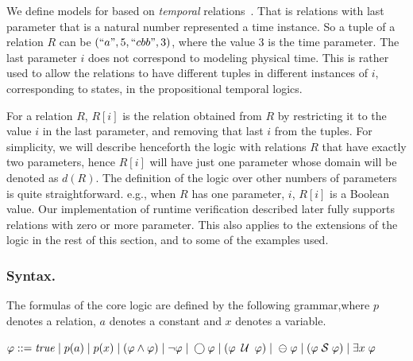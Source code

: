 We define models for \FLTL{} based on {\em temporal} relations~\cite{Chomicki}. That is relations with
last parameter
that is a natural number represented a time instance. So a tuple of
a relation $R$ can be $(``a", 5, ``cbb", 3)$, where
the  value $3$ is the time parameter. The last parameter $i$
does not correspond to modeling physical time. This
is rather used to allow the relations to have
different tuples in different instances of $i$,
corresponding to states, in the propositional temporal
logics.

For a relation $R$, $R [ i ]$ is the relation obtained from $R$ by
restricting it to the value $i$ in the last parameter, and removing that last $i$ from the tuples. For simplicity, we will describe henceforth
the logic with relations $R$ that have exactly two parameters, 
hence $R [ i ]$ will have just one parameter whose domain will be denoted as $d ( R )$. The definition of the logic over other numbers of parameters is quite straightforward. e.g., when $R$ has one parameter, $i$,
$R [ i ]$ is a Boolean value. Our implementation of runtime verification described later fully supports relations with zero or more parameter. This also applies to the extensions of the logic in the rest of this section, and to some of the examples used.



\subsubsection{Syntax.} 

The formulas of the core \FLTL{} logic are 
defined by the following grammar,where $p$ denotes a relation,
$a$ denotes a constant and $x$ denotes a variable. 
\begin{center}
$\varphi ::= \mathit{true}  \; | \;
    p ( a ) \; | \;
    p ( x ) \; | \;
    ( \varphi \wedge \varphi ) \;  |   \;
   \neg \varphi \; | \;
   \bigcirc \varphi \; | \; 
   ( \varphi \; \mathbin{\mathcal{U}} \; \varphi ) \; | $ %
   $ \ominus \; \varphi \; | \;
    ( \varphi  \; {\cal S}  \; \varphi ) \; | \;
    \exists x \; \varphi$
\end{center}


